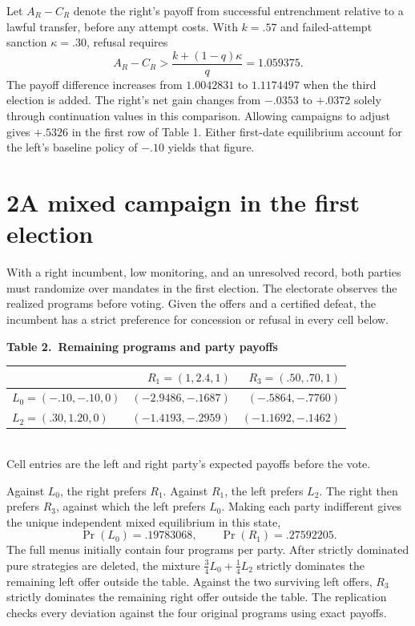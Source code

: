 \documentclass[11pt,letterpaper]{article}
\begin{document}
Let \(A_R-C_R\) denote the right's payoff from successful entrenchment relative to a lawful transfer, before any attempt costs. With \(k=.57\) and failed-attempt sanction \(\kappa=.30\), refusal requires
\[
 A_R-C_R>\frac{k+(1-q)\kappa}{q}=1.059375.
\]
The payoff difference increases from \(1.0042831\) to \(1.1174497\) when the third election is added. The right's net gain changes from \(-.0353\) to \(+.0372\) solely through continuation values in this comparison. Allowing campaigns to adjust gives \(+.5326\) in the first row of Table 1. Either first-date equilibrium account for the left's baseline policy of \(-.10\) yields that figure.

\newpage
\section*{2\quad A mixed campaign in the first election}
With a right incumbent, low monitoring, and an unresolved record, both parties must randomize over mandates in the first election. The electorate observes the realized programs before voting. Given the offers and a certified defeat, the incumbent has a strict preference for concession or refusal in every cell below.

\begin{center}\small
\textbf{Table 2.\ Remaining programs and party payoffs}\\[5pt]
\begin{tabular}{@{}lrr@{}}\toprule
& \(R_1=(1,2.4,1)\) & \(R_3=(.50,.70,1)\)\\\midrule
\(L_0=(-.10,-.10,0)\) & $(-2.9486,-.1687)$ & $(-.5864,-.7760)$\\
\(L_2=(.30,1.20,0)\) & $(-1.4193,-.2959)$ & $(-1.1692,-.1462)$\\\bottomrule
\end{tabular}\\[3pt]
Cell entries are the left and right party's expected payoffs before the vote.
\end{center}

Against \(L_0\), the right prefers \(R_1\). Against \(R_1\), the left prefers \(L_2\). The right then prefers \(R_3\), against which the left prefers \(L_0\). Making each party indifferent gives the unique independent mixed equilibrium in this state,
\[
 \Pr(L_0)=.19783068,\qquad \Pr(R_1)=.27592205 .
\]
The full menus initially contain four programs per party. After strictly dominated pure strategies are deleted, the mixture \(\tfrac34 L_0+\tfrac14L_2\) strictly dominates the remaining left offer outside the table. Against the two surviving left offers, \(R_3\) strictly dominates the remaining right offer outside the table. The replication checks every deviation against the four original programs using exact payoffs.
\end{document}
